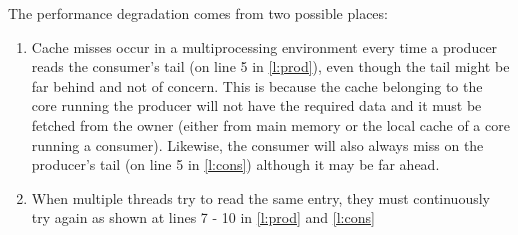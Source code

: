 
The performance degradation comes from two possible places:
\begin{enumerate}
\item Cache misses occur in a multiprocessing environment every time a producer reads the
consumer's tail (on line 5 in \autoref{l:prod}), even though the tail might be far behind and not
of concern. This is because the cache belonging to the core running the producer will not have the
required data and it must be fetched from the owner (either from main memory or the local cache of
a core running a consumer). Likewise, the consumer will also always miss on the 
producer's tail (on line 5 in \autoref{l:cons}) although it may be far ahead.
\item When multiple threads try to read the same entry, they must continuously try again as shown at lines 7 - 10 in 
\autoref{l:prod} and \autoref{l:cons}
\end{enumerate}

